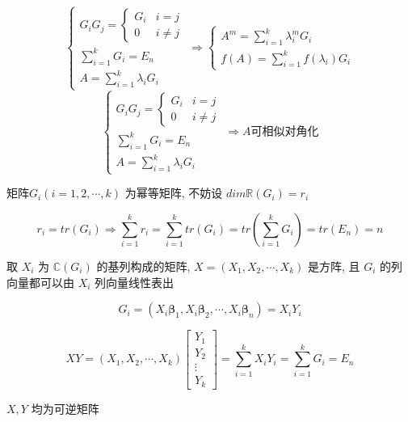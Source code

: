 \begin{anymark}[证明]
	$$\begin{cases}
	  G_{i}G_{j} = 
	  \begin{cases}
		 G_{i} & i = j\\
		 0 & i\neq j	
	  \end{cases}\\
	  \sum\limits_{i=1}^{k}G_{i} = E_{n}\\
	  A = \sum\limits_{i=1}^{k}\lambda_{i}G_{i}
	\end{cases}\Rightarrow 
	\begin{cases}
	  A^{m} = \sum\limits_{i=1}^{k}\lambda_{i}^{m}G_{i}\\
	  f(A) = \sum\limits_{i=1}^{k}f(\lambda_{i})G_{i}			
	\end{cases}$$
	$$\begin{cases}
	  G_{i}G_{j} = 
	  \begin{cases}
		 G_{i} & i = j\\
		 0 & i\neq j	
	  \end{cases}\\
	  \sum\limits_{i=1}^{k}G_{i} = E_{n}\\
	  A = \sum\limits_{i=1}^{k}\lambda_{i}G_{i}
	\end{cases}\Rightarrow A\text{可相似对角化}$$
	
	矩阵$G_{i}(i = 1,2,\cdots,k)$ 为幂等矩阵, 不妨设 $dim\mathbb{R}(G_{i}) = r_{i}$

	$$r_{i} = tr(G_{i}) \Rightarrow \sum\limits_{i = 1}^{k}r_{i} = \sum\limits_{i=1}^{k}tr(G_{i}) = tr(\sum\limits_{i=1}^{k}G_{i})=tr(E_{n})=n$$
	
	取 $X_{i}$ 为 $\mathbb{C}(G_{i})$ 的基列构成的矩阵, $X = (X_{1},X_{2},\cdots,X_{k})$ 是方阵, 且 $G_{i}$ 的列向量都可以由 $X_{i}$ 列向量线性表出  
	
	$$G_{i} = (X_{i}\boldsymbol{\beta}_{1},X_{i}\boldsymbol{\beta}_{2},\cdots,X_{i}\boldsymbol{\beta}_{n}) = X_{i}Y_{i}$$
	
	$$XY = (X_{1},X_{2},\cdots,X_{k}) 
	\begin{bmatrix}
		Y_{1}\\
		Y_{2}\\
		\vdots\\
		Y_{k}
	\end{bmatrix} = \sum\limits_{i=1}^{k}X_{i}Y_{i} = \sum\limits_{i = 1}^{k}G_{i} =  E_{n}$$

	$X,Y$ 均为可逆矩阵


\end{anymark}
